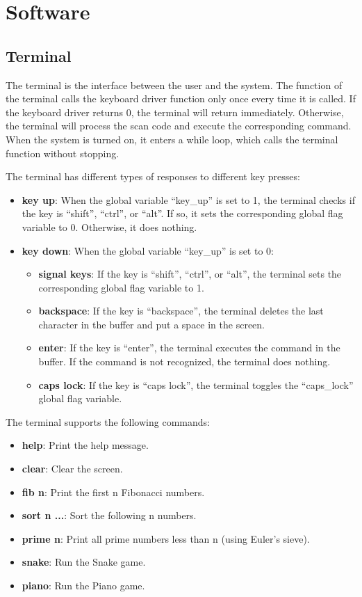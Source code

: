 \documentclass[
	a4paper, %
	11pt, %
]{CSUniSchoolLabReport}
\begin{document}
\section{Software}
\subsection{Terminal}
The terminal is the interface between the user and the system. The function of the terminal calls the keyboard driver function only once every time it is called. If the keyboard driver returns 0, the terminal will return immediately. Otherwise, the terminal will process the scan code and execute the corresponding command. When the system is turned on, it enters a while loop, which calls the terminal function without stopping.

The terminal has different types of responses to different key presses:
\begin{itemize}
    \item \textbf{key up}: When the global variable ``key\_up'' is set to 1, the terminal checks if the key is ``shift'', ``ctrl'', or ``alt''. If so, it sets the corresponding global flag variable to 0. Otherwise, it does nothing.
    \item \textbf{key down}: When the global variable ``key\_up'' is set to 0:
          \begin{itemize}
              \item \textbf{signal keys}: If the key is ``shift'', ``ctrl'', or ``alt'', the terminal sets the corresponding global flag variable to 1.
              \item \textbf{backspace}: If the key is ``backspace'', the terminal deletes the last character in the buffer and put a space in the screen.
              \item \textbf{enter}: If the key is ``enter'', the terminal executes the command in the buffer. If the command is not recognized, the terminal does nothing.
              \item \textbf{caps lock}: If the key is ``caps lock'', the terminal toggles the ``caps\_lock'' global flag variable.
          \end{itemize}
\end{itemize}
The terminal supports the following commands:
\begin{itemize}
    \item \textbf{help}: Print the help message.
    \item \textbf{clear}: Clear the screen.
    \item \textbf{fib n}: Print the first n Fibonacci numbers.
    \item \textbf{sort n ...}: Sort the following n numbers.
    \item \textbf{prime n}: Print all prime numbers less than n (using Euler's sieve).
    \item \textbf{snake}: Run the Snake game.
    \item \textbf{piano}: Run the Piano game.
\end{itemize}
\end{document}
